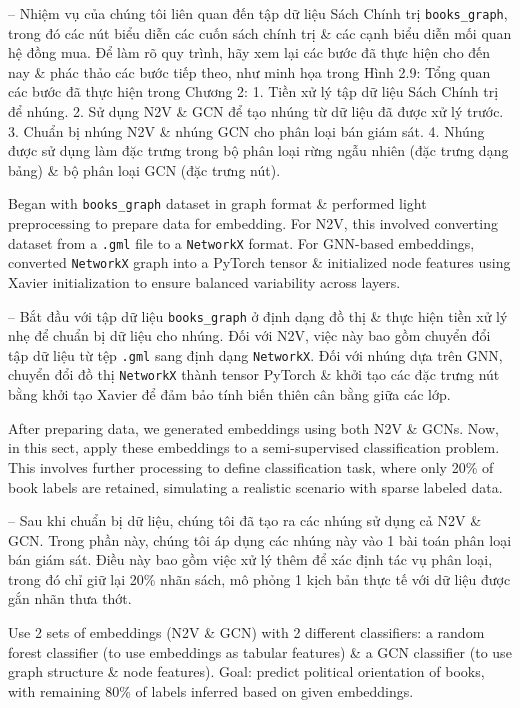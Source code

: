 \documentclass{article}
\begin{document}
\begin{itemize}
\begin{itemize}
       -- Nhiệm vụ của chúng tôi liên quan đến tập dữ liệu Sách Chính trị \verb|books_graph|, trong đó các nút biểu diễn các cuốn sách chính trị \& các cạnh biểu diễn mối quan hệ đồng mua. Để làm rõ quy trình, hãy xem lại các bước đã thực hiện cho đến nay \& phác thảo các bước tiếp theo, như minh họa trong {\sf Hình 2.9: Tổng quan các bước đã thực hiện trong Chương 2: 1. Tiền xử lý tập dữ liệu Sách Chính trị để nhúng. 2. Sử dụng N2V \& GCN để tạo nhúng từ dữ liệu đã được xử lý trước. 3. Chuẩn bị nhúng N2V \& nhúng GCN cho phân loại bán giám sát. 4. Nhúng được sử dụng làm đặc trưng trong bộ phân loại rừng ngẫu nhiên (đặc trưng dạng bảng) \& bộ phân loại GCN (đặc trưng nút).}

       Began with \verb|books_graph| dataset in graph format \& performed light preprocessing to prepare data for embedding. For N2V, this involved converting dataset from a {\tt.gml} file to a {\tt NetworkX} format. For GNN-based embeddings, converted {\tt NetworkX} graph into a PyTorch tensor \& initialized node features using Xavier initialization to ensure balanced variability across layers.

       -- Bắt đầu với tập dữ liệu \verb|books_graph| ở định dạng đồ thị \& thực hiện tiền xử lý nhẹ để chuẩn bị dữ liệu cho nhúng. Đối với N2V, việc này bao gồm chuyển đổi tập dữ liệu từ tệp {\tt.gml} sang định dạng {\tt NetworkX}. Đối với nhúng dựa trên GNN, chuyển đổi đồ thị {\tt NetworkX} thành tensor PyTorch \& khởi tạo các đặc trưng nút bằng khởi tạo Xavier để đảm bảo tính biến thiên cân bằng giữa các lớp.

       After preparing data, we generated embeddings using both N2V \& GCNs. Now, in this sect, apply these embeddings to a semi-supervised classification problem. This involves further processing to define classification task, where only 20\% of book labels are retained, simulating a realistic scenario with sparse labeled data.

       -- Sau khi chuẩn bị dữ liệu, chúng tôi đã tạo ra các nhúng sử dụng cả N2V \& GCN. Trong phần này, chúng tôi áp dụng các nhúng này vào 1 bài toán phân loại bán giám sát. Điều này bao gồm việc xử lý thêm để xác định tác vụ phân loại, trong đó chỉ giữ lại 20\% nhãn sách, mô phỏng 1 kịch bản thực tế với dữ liệu được gắn nhãn thưa thớt.

       Use 2 sets of embeddings (N2V \& GCN) with 2 different classifiers: a random forest classifier (to use embeddings as tabular features) \& a GCN classifier (to use graph structure \& node features). Goal: predict political orientation of books, with remaining 80\% of labels inferred based on given embeddings.


\end{itemize}
\end{itemize}
\end{document}
